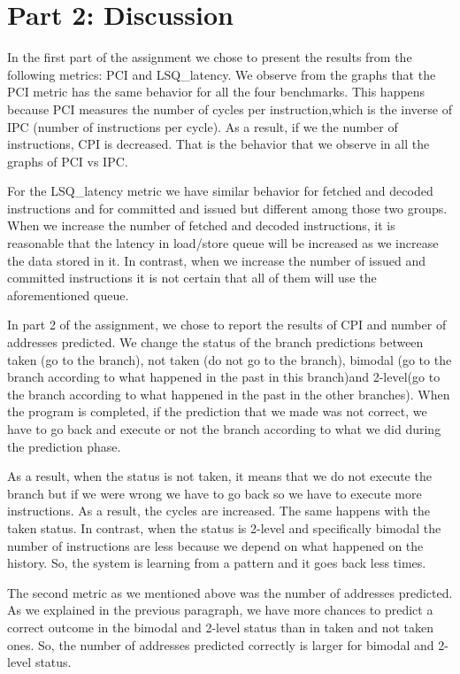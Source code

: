 \documentclass[a4paper,12pt]{article}
\begin{document}
\section*{Part 2: Discussion}
In the first part of the assignment we chose to present the results from the following metrics: PCI and LSQ\_latency. We observe from the graphs that the PCI metric has the same behavior for all the four benchmarks. This happens because PCI measures the number of cycles per instruction,which is the inverse of IPC (number of instructions per cycle). As a result, if we the number of instructions, CPI is decreased. That is the behavior that we observe in all the graphs of PCI vs IPC. 
\par For the LSQ\_latency metric we have similar behavior for fetched and decoded instructions and for committed and issued but different among those two groups. When we increase the number of fetched and decoded instructions, it is reasonable that the latency in load/store queue will be increased as we increase the data stored in it. In contrast, when we increase the number of issued and committed instructions it is not certain that all of them will use the aforementioned queue. 
\par In part 2 of the assignment, we chose to report the results of CPI and number of addresses predicted. We change the status of the branch predictions between taken (go to the branch), not taken (do not go to the branch), bimodal (go to the branch according to what happened in the past in this branch)and 2-level(go to the branch according to what happened in the past in the other branches). When the program is completed, if the prediction that we made was not correct, we have to go back and execute or not the branch according to what we did during the prediction phase. 
\par As a result, when the status is not taken, it means that we do not execute the branch but if we were wrong we have to go back so we have to execute more instructions. As a result, the cycles are increased. The same happens with the taken status. In contrast, when the status is 2-level and specifically bimodal the number of instructions are less because we depend on what happened on the history. So, the system is learning from a pattern and it goes back less times. 
\par The second metric as we mentioned above was the number of addresses predicted. As we explained in the previous paragraph, we have more chances to predict a correct outcome in the bimodal and 2-level status than in taken and not taken ones. So, the number of addresses predicted correctly is larger for bimodal and 2-level status. 
\end{document}
